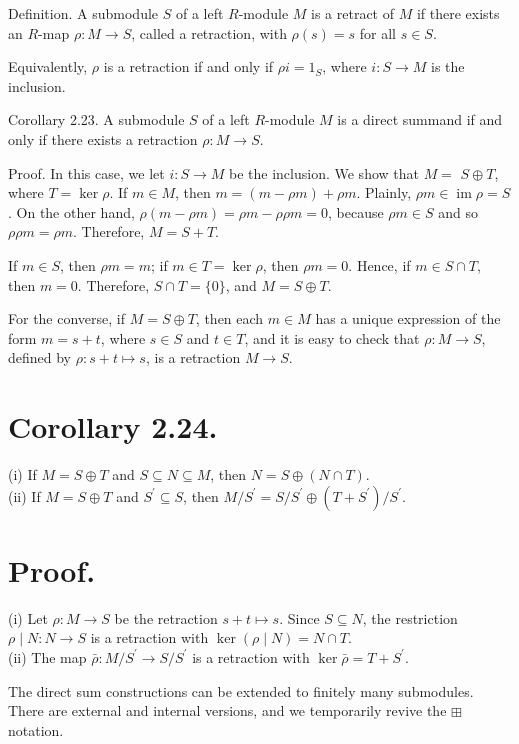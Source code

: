 \documentclass[10pt]{article}
\begin{document}
Definition. A submodule $S$ of a left $R$-module $M$ is a retract of $M$ if there exists an $R$-map $\rho: M \rightarrow S$, called a retraction, with $\rho(s)=s$ for all $s \in S$.

Equivalently, $\rho$ is a retraction if and only if $\rho i=1_{S}$, where $i: S \rightarrow M$ is the inclusion.

Corollary 2.23. A submodule $S$ of a left $R$-module $M$ is a direct summand if and only if there exists a retraction $\rho: M \rightarrow S$.

Proof. In this case, we let $i: S \rightarrow M$ be the inclusion. We show that $M=$ $S \oplus T$, where $T=\operatorname{ker} \rho$. If $m \in M$, then $m=(m-\rho m)+\rho m$. Plainly, $\rho m \in \operatorname{im} \rho=S$. On the other hand, $\rho(m-\rho m)=\rho m-\rho \rho m=0$, because $\rho m \in S$ and so $\rho \rho m=\rho m$. Therefore, $M=S+T$.

If $m \in S$, then $\rho m=m$; if $m \in T=\operatorname{ker} \rho$, then $\rho m=0$. Hence, if $m \in S \cap T$, then $m=0$. Therefore, $S \cap T=\{0\}$, and $M=S \oplus T$.

For the converse, if $M=S \oplus T$, then each $m \in M$ has a unique expression of the form $m=s+t$, where $s \in S$ and $t \in T$, and it is easy to check that $\rho: M \rightarrow S$, defined by $\rho: s+t \mapsto s$, is a retraction $M \rightarrow S$.

\section*{Corollary 2.24.}
(i) If $M=S \oplus T$ and $S \subseteq N \subseteq M$, then $N=S \oplus(N \cap T)$.\\
(ii) If $M=S \oplus T$ and $S^{\prime} \subseteq S$, then $M / S^{\prime}=S / S^{\prime} \oplus\left(T+S^{\prime}\right) / S^{\prime}$.

\section*{Proof.}
(i) Let $\rho: M \rightarrow S$ be the retraction $s+t \mapsto s$. Since $S \subseteq N$, the restriction $\rho \mid N: N \rightarrow S$ is a retraction with $\operatorname{ker}(\rho \mid N)=N \cap T$.\\
(ii) The map $\bar{\rho}: M / S^{\prime} \rightarrow S / S^{\prime}$ is a retraction with $\operatorname{ker} \bar{\rho}=T+S^{\prime}$.

The direct sum constructions can be extended to finitely many submodules. There are external and internal versions, and we temporarily revive the $\boxplus$ notation.
\end{document}
